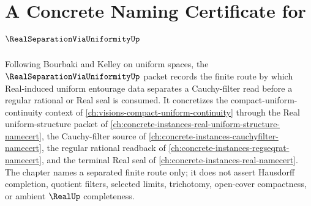 \chapter{A Concrete Naming Certificate for $\RealSeparationViaUniformityUp$}
\label{ch:concrete-instances-real-separation-via-uniformity-namecert}

Following Bourbaki and Kelley on uniform spaces, the $\RealSeparationViaUniformityUp$ packet records the finite route by which Real-induced uniform entourage data separates a Cauchy-filter read before a regular rational or Real seal is consumed. It concretizes the compact-uniform-continuity context of \autoref{ch:visions-compact-uniform-continuity} through the Real uniform-structure packet of \autoref{ch:concrete-instances-real-uniform-structure-namecert}, the Cauchy-filter source of \autoref{ch:concrete-instances-cauchyfilter-namecert}, the regular rational readback of \autoref{ch:concrete-instances-regseqrat-namecert}, and the terminal Real seal of \autoref{ch:concrete-instances-real-namecert}. The chapter names a separated finite route only; it does not assert Hausdorff completion, quotient filters, selected limits, trichotomy, open-cover compactness, or ambient $\RealUp$ completeness.

